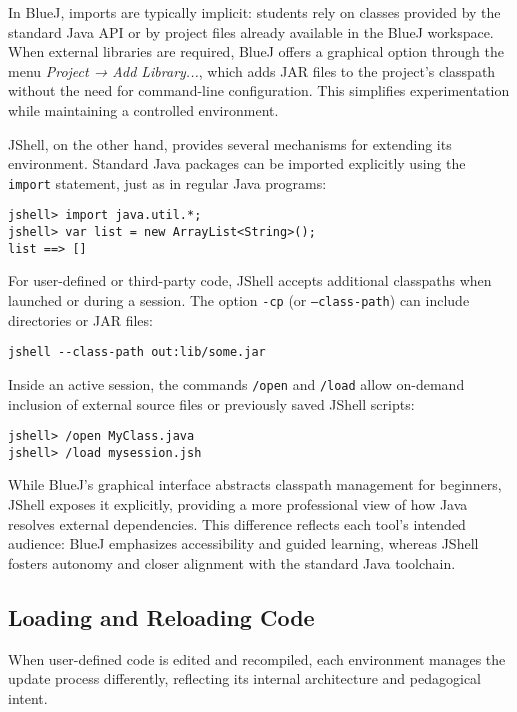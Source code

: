 \documentclass{article}
\begin{document}
In BlueJ, imports are typically implicit: students rely on classes provided by the standard Java API or by project files already available in the BlueJ workspace. When external libraries are required, BlueJ offers a graphical option through the menu \textit{Project → Add Library...}, which adds JAR files to the project’s classpath without the need for command-line configuration. This simplifies experimentation while maintaining a controlled environment.

JShell, on the other hand, provides several mechanisms for extending its environment. Standard Java packages can be imported explicitly using the \texttt{import} statement, just as in regular Java programs:

\begin{lstlisting}
jshell> import java.util.*;
jshell> var list = new ArrayList<String>();
list ==> []
\end{lstlisting}

For user-defined or third-party code, JShell accepts additional classpaths when launched or during a session. The option \texttt{-cp} (or \texttt{--class-path}) can include directories or JAR files:

\begin{lstlisting}
jshell --class-path out:lib/some.jar
\end{lstlisting}

Inside an active session, the commands \texttt{/open} and \texttt{/load} allow on-demand inclusion of external source files or previously saved JShell scripts:

\begin{lstlisting}
jshell> /open MyClass.java
jshell> /load mysession.jsh
\end{lstlisting}

While BlueJ’s graphical interface abstracts classpath management for beginners, JShell exposes it explicitly, providing a more professional view of how Java resolves external dependencies. This difference reflects each tool’s intended audience: BlueJ emphasizes accessibility and guided learning, whereas JShell fosters autonomy and closer alignment with the standard Java toolchain.


\subsection{Loading and Reloading Code}

When user-defined code is edited and recompiled, each environment manages the update process differently, reflecting its internal architecture and pedagogical intent.
\end{document}
